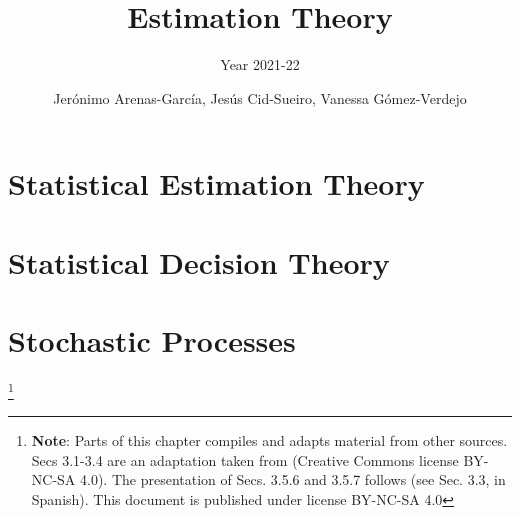 \documentclass[graybox,envcountchap,sectrefs]{svmono_mod}
\begin{document}
\author{Jer\'onimo Arenas-Garc\'ia, Jes\'us Cid-Sueiro, Vanessa G\'omez-Verdejo}
\title{Estimation Theory}
\subtitle{Year 2021-22}

\frontmatter

\mainmatter %

\chapter{Statistical Estimation Theory}

\localtableofcontents
\newpage








\chapter{Statistical Decision Theory}
\label{ch:SDT}

\localtableofcontents

%


\chapter{Stochastic Processes}

\footnote{\textbf{Note}: Parts of this chapter compiles and adapts material from other sources. Secs 3.1-3.4 are an adaptation taken from \cite{MITcourse} (Creative Commons license BY-NC-SA 4.0). The presentation of Secs. 3.5.6 and 3.5.7 follows \cite{ComDig2007} (see Sec. 3.3, in Spanish). This document is published under license BY-NC-SA 4.0}

\localtableofcontents


\end{document}
